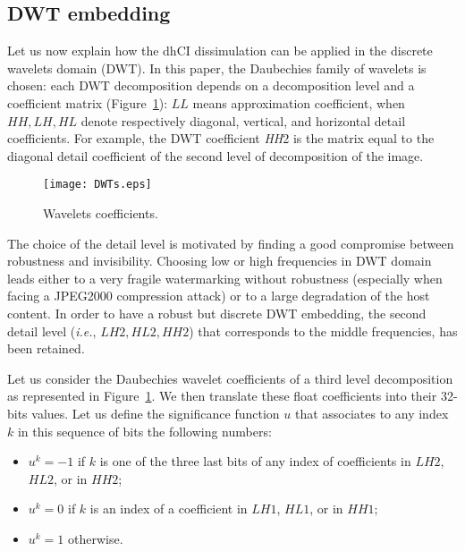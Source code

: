 \documentclass{comjnl}
\begin{document}
\subsection{DWT embedding}

Let us now explain how the dhCI dissimulation can be applied in
the discrete wavelets domain (DWT).
In this paper, the Daubechies family of wavelets is chosen: 
each DWT decomposition depends on a decomposition level and a coefficient
matrix (Figure~\ref{fig:DWTs}): $\textit{LL}$ means approximation coefficient,
when $\textit{HH},\textit{LH},\textit{HL}$ denote respectively diagonal, 
vertical, and horizontal detail coefficients. 
For example, the DWT coefficient \textit{HH}2 is the matrix equal to the 
diagonal detail coefficient of the second level of decomposition of the image.

\begin{figure}[htb]
\centerline{
\texttt{[image: DWTs.eps]}
}
\caption{Wavelets coefficients.}
\label{fig:DWTs}
\end{figure}






The choice of the detail level is motivated by finding
a good compromise between robustness and invisibility.
Choosing low or high frequencies in DWT domain leads either to a very
fragile watermarking without robustness (especially when facing a
JPEG2000 compression attack) or to a large degradation of the host
content. 
In order to have a robust but discrete DWT embedding, 
the second detail level 
(\textit{i.e.}, $\textit{LH}2,\textit{HL}2,\textit{HH}2$) 
that corresponds to the middle frequencies,
has been retained.






Let us consider the Daubechies wavelet coefficients of a third
level decomposition as represented in Figure~\ref{fig:DWTs}. 
We then translate these float coefficients into their 32-bits values.
Let us define the  significance function $u$ that associates to any index $k$ in this sequence of bits the following numbers:
\begin{itemize}
\item $u^k = -1$ if $k$ is one of the three last bits of any index of
  coefficients in  $\textit{LH}2$, $\textit{HL}2$, or in $\textit{HH}2$;
\item $u^k = 0$ if $k$ is an index of a coefficient in  
  $\textit{LH}1$, $\textit{HL}1$, or in $\textit{HH}1$;
\item $u^k = 1$ otherwise.
\end{itemize}
\end{document}
